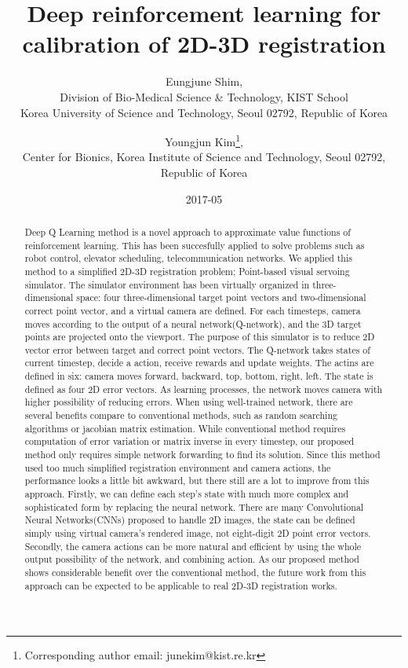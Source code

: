 \documentclass[10pt]{article}
\begin{document}
\title{Deep reinforcement learning for calibration of 2D-3D registration}

\author{Eungjune Shim, \\
Division of Bio-Medical Science \& Technology, KIST School \\
Korea University of Science and Technology, Seoul 02792, Republic of Korea
\and Youngjun Kim\thanks{Corresponding author email: junekim@kist.re.kr},
\\ Center for Bionics, Korea Institute of Science and Technology, Seoul 02792, Republic of Korea}

\date{2017-05}
\maketitle

\begin{abstract}
 Deep Q Learning method is a novel approach to approximate value functions of reinforcement learning. This has been succesfully applied to solve problems such as robot control, elevator scheduling, telecommunication networks. We applied this method to a simplified 2D-3D registration problem; Point-based visual servoing simulator. The simulator environment has been virtually organized in three-dimensional space: four three-dimensional target point vectors and two-dimensional correct point vector, and a virtual camera are defined. For each timesteps, camera moves according to the output of a neural network(Q-network), and the 3D target points are projected onto the viewport. The purpose of this simulator is to reduce 2D vector error between target and correct point vectors. The Q-network takes states of current timestep, decide a action, receive rewards and update weights. The actins are defined in six: camera moves forward, backward, top, bottom, right, left. The state is defined as four 2D error vectors. As learning processes, the network moves camera with higher possibility of reducing errors. When using well-trained network, there are several benefits compare to conventional methods, such as random searching algorithms or jacobian matrix estimation. While conventional method requires computation of error variation or matrix inverse in every timestep, our proposed method only requires simple network forwarding to find its solution. Since this method used too much simplified registration environment and camera actions, the performance looks a little bit awkward, but there still are a lot to improve from this approach. Firstly, we can define each step's state with much more complex and sophisticated form by replacing the neural network. There are many Convolutional Neural Networks(CNNs) proposed to handle 2D images, the state can be defined simply using virtual camera's rendered image, not eight-digit 2D point error vectors. Secondly, the camera actions can be more natural and efficient by using the whole output possibility of the network, and combining action. As our proposed method shows considerable benefit over the conventional method, the future work from this approach can be expected to be applicable to real 2D-3D registration works.


\end{abstract}
\end{document}
